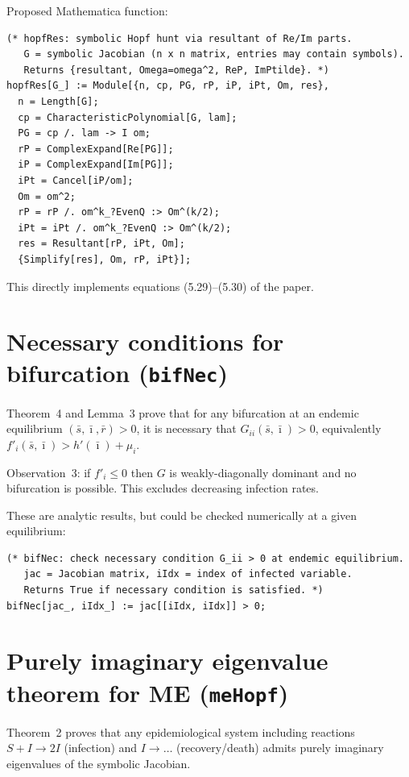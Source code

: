 \documentclass[11pt]{article}
\begin{document}
Proposed Mathematica function:
\begin{verbatim}
(* hopfRes: symbolic Hopf hunt via resultant of Re/Im parts.
   G = symbolic Jacobian (n x n matrix, entries may contain symbols).
   Returns {resultant, Omega=omega^2, ReP, ImPtilde}. *)
hopfRes[G_] := Module[{n, cp, PG, rP, iP, iPt, Om, res},
  n = Length[G];
  cp = CharacteristicPolynomial[G, lam];
  PG = cp /. lam -> I om;
  rP = ComplexExpand[Re[PG]];
  iP = ComplexExpand[Im[PG]];
  iPt = Cancel[iP/om];
  Om = om^2;
  rP = rP /. om^k_?EvenQ :> Om^(k/2);
  iPt = iPt /. om^k_?EvenQ :> Om^(k/2);
  res = Resultant[rP, iPt, Om];
  {Simplify[res], Om, rP, iPt}];
\end{verbatim}

This directly implements equations (5.29)--(5.30) of the paper.


\section{Necessary conditions for bifurcation (\texttt{bifNec})}

Theorem~4 and Lemma~3 prove that for any bifurcation at an endemic
equilibrium $(\bar s,\bar\imath,\bar r) > 0$, it is necessary that
$G_{ii}(\bar s,\bar\imath) > 0$, equivalently
$f'_i(\bar s,\bar\imath) > h'(\bar\imath) + \mu_i$.

Observation~3: if $f'_i \le 0$ then $G$ is weakly-diagonally dominant and no
bifurcation is possible. This excludes decreasing infection rates.

These are analytic results, but could be checked numerically at a given
equilibrium:
\begin{verbatim}
(* bifNec: check necessary condition G_ii > 0 at endemic equilibrium.
   jac = Jacobian matrix, iIdx = index of infected variable.
   Returns True if necessary condition is satisfied. *)
bifNec[jac_, iIdx_] := jac[[iIdx, iIdx]] > 0;
\end{verbatim}


\section{Purely imaginary eigenvalue theorem for ME (\texttt{meHopf})}

Theorem~2 proves that any epidemiological system including reactions
$S+I \to 2I$ (infection) and $I \to \ldots$ (recovery/death) admits purely
imaginary eigenvalues of the symbolic Jacobian.
\end{document}

